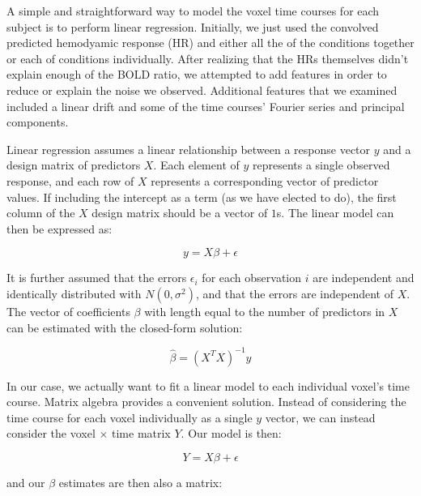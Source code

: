 
\par \indent A simple and straightforward way to model the voxel time courses 
for each subject is to perform linear regression. Initially, we just used the 
convolved predicted hemodyamic response (HR) and either all the of the 
conditions together or each of conditions individually. After realizing that 
the HRs themselves didn't explain enough of the BOLD ratio, we attempted to 
add features in order to reduce or explain the noise we observed. Additional 
features that we examined included a linear drift and some of the time 
courses' Fourier series and principal components.

\par Linear regression assumes a linear relationship between a response 
vector $y$ and a design matrix of predictors $X$. Each element of $y$ 
represents a single observed response, and each row of $X$ represents a 
corresponding vector of predictor values. If including the intercept as a 
term (as we have elected to do), the first column of the $X$ design matrix 
should be a vector of $1$s. The linear model can then be expressed as: 

\begin{equation}
y = X\beta + \epsilon
\end{equation}

\par It is further assumed that the errors $\epsilon_i$ for each observation 
$i$ are independent and identically distributed with $N(0, \sigma^2)$, and 
that the errors are independent of $X$. The vector of coefficients $\beta$ 
with length equal to the number of predictors in $X$ can be estimated with 
the closed-form solution:

\begin{equation}
\hat{\beta} =(X^T X)^{-1} y
\end{equation}

\par In our case, we actually want to fit a linear model to each individual 
voxel's time course. Matrix algebra provides a convenient solution. Instead of 
considering the time course for each voxel individually as a single $y$ 
vector, we can instead consider the voxel $\times$ time matrix $Y$. Our model 
is then:

\begin{equation}
Y = X\beta + \epsilon
\end{equation}

\noindent and our $\beta$ estimates are then also a matrix: 

